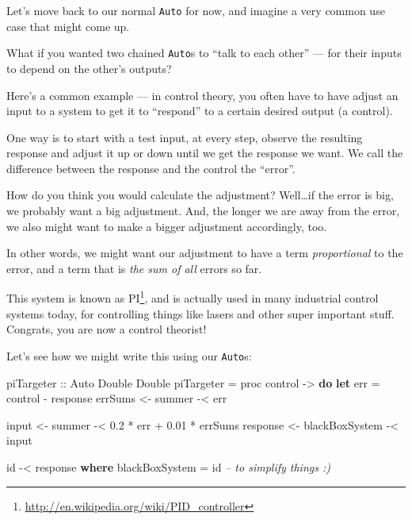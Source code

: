 \documentclass[]{article}
\newenvironment{Shaded}{}{}
\newcommand{\CommentTok}[1]{\textcolor[rgb]{0.38,0.63,0.69}{\textit{#1}}}
\newcommand{\DataTypeTok}[1]{\textcolor[rgb]{0.56,0.13,0.00}{#1}}
\newcommand{\FloatTok}[1]{\textcolor[rgb]{0.25,0.63,0.44}{#1}}
\newcommand{\FunctionTok}[1]{\textcolor[rgb]{0.02,0.16,0.49}{#1}}
\newcommand{\KeywordTok}[1]{\textcolor[rgb]{0.00,0.44,0.13}{\textbf{#1}}}
\newcommand{\NormalTok}[1]{#1}
\newcommand{\OtherTok}[1]{\textcolor[rgb]{0.00,0.44,0.13}{#1}}
\renewcommand{\href}[2]{#2\footnote{\url{#1}}}
\begin{document}
Let's move back to our normal \texttt{Auto} for now, and imagine a very common
use case that might come up.

What if you wanted two chained \texttt{Auto}s to ``talk to each other'' --- for
their inputs to depend on the other's outputs?

Here's a common example --- in control theory, you often have to have adjust an
input to a system to get it to ``respond'' to a certain desired output (a
control).

One way is to start with a test input, at every step, observe the resulting
response and adjust it up or down until we get the response we want. We call the
difference between the response and the control the ``error''.

How do you think you would calculate the adjustment? Well\ldots{}if the error is
big, we probably want a big adjustment. And, the longer we are away from the
error, we also might want to make a bigger adjustment accordingly, too.

In other words, we might want our adjustment to have a term \emph{proportional}
to the error, and a term that is \emph{the sum of all} errors so far.

This system is known as \href{http://en.wikipedia.org/wiki/PID_controller}{PI},
and is actually used in many industrial control systems today, for controlling
things like lasers and other super important stuff. Congrats, you are now a
control theorist!

Let's see how we might write this using our \texttt{Auto}s:

\begin{Shaded}
\begin{Highlighting}[]
\OtherTok{piTargeter ::} \DataTypeTok{Auto} \DataTypeTok{Double} \DataTypeTok{Double}
\NormalTok{piTargeter }\FunctionTok{=}\NormalTok{ proc control }\OtherTok{->} \KeywordTok{do}
    \KeywordTok{let}\NormalTok{ err }\FunctionTok{=}\NormalTok{ control }\FunctionTok{-}\NormalTok{ response}
\NormalTok{    errSums  }\OtherTok{<-}\NormalTok{ summer         }\FunctionTok{-<}\NormalTok{ err}

\NormalTok{    input    }\OtherTok{<-}\NormalTok{ summer         }\FunctionTok{-<} \FloatTok{0.2} \FunctionTok{*}\NormalTok{ err }\FunctionTok{+} \FloatTok{0.01} \FunctionTok{*}\NormalTok{ errSums}
\NormalTok{    response }\OtherTok{<-}\NormalTok{ blackBoxSystem }\FunctionTok{-<}\NormalTok{ input}

\NormalTok{    id }\FunctionTok{-<}\NormalTok{ response}
  \KeywordTok{where}
\NormalTok{    blackBoxSystem }\FunctionTok{=}\NormalTok{ id     }\CommentTok{-- to simplify things :)}
\end{Highlighting}
\end{Shaded}
\end{document}
